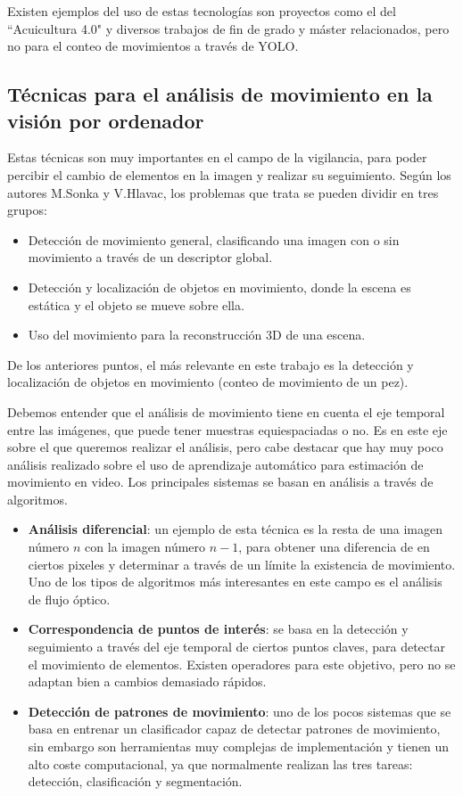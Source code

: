 Existen ejemplos del uso de estas tecnologías son proyectos como el del  ``Acuicultura 4.0"\cite{Acuicultura} y diversos trabajos de fin de grado y máster relacionados, pero no para el conteo de movimientos a través de YOLO.

\subsection{Técnicas para el análisis de movimiento en la visión por ordenador}

Estas técnicas son muy importantes en el campo de la vigilancia, para poder percibir el cambio de elementos en la imagen y realizar su seguimiento. Según los autores M.Sonka y V.Hlavac\cite{sonkaImageProcessingAnalysis2013}, los problemas que 
trata se pueden dividir en tres grupos:

\begin{itemize}
    \item Detección de movimiento general, clasificando una imagen con o sin movimiento a través de un descriptor global.
    \item Detección y localización de objetos en movimiento, donde la escena es estática y el objeto se mueve sobre ella.
    \item Uso del movimiento para la reconstrucción 3D de una escena.
\end{itemize}

De los anteriores puntos, el más relevante en este trabajo es la detección y localización de objetos en movimiento (conteo de movimiento de un pez).

Debemos entender que el análisis de movimiento tiene en cuenta el eje temporal entre las imágenes, que puede tener muestras equiespaciadas o no. Es en este eje sobre el que queremos realizar el análisis, pero 
cabe destacar que hay muy poco análisis realizado sobre el uso de aprendizaje automático para estimación de movimiento en video. Los principales sistemas se basan en análisis a través de algoritmos.

\begin{itemize}
    \item \textbf{Análisis diferencial}: un ejemplo de esta técnica es la resta de una imagen número $n$ con la imagen número $n-1$, para obtener una diferencia de en ciertos pixeles y determinar a través de un límite 
    la existencia de movimiento. Uno de los tipos de algoritmos más interesantes en este campo es el análisis de flujo óptico.
    \item \textbf{Correspondencia de puntos de interés}: se basa en la detección y seguimiento a través del eje temporal de ciertos puntos claves, para detectar el movimiento de elementos. Existen operadores para este 
    objetivo, pero no se adaptan bien a cambios demasiado rápidos.
    \item \textbf{Detección de patrones de movimiento}: uno de los pocos sistemas que se basa en entrenar un clasificador capaz de detectar patrones de movimiento, sin embargo son herramientas muy complejas 
    de implementación y tienen un alto coste computacional, ya que normalmente realizan las tres tareas: detección, clasificación y segmentación.
\end{itemize}

